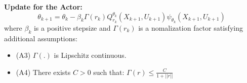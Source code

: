 \documentclass{article}
\begin{document}
\begin{flushleft}
\textbf{Update for the Actor: }
$$\theta_{k+1}=\theta_k-\beta_k\Gamma(r_k){Q_{r_k}^{\theta_k}(X_{k+1},U_{k+1})\psi_{\theta_k}(X_{k+1},U_{k+1})}$$
where $\beta_k$ is a positive stepsize and $\Gamma(r_k)$ is a nomalization factor satisfying additional assumptions:

\begin{itemize}
 \begin{itemize}
\item (A3) $\Gamma(.)$ is Lipschitz continuous. 
\item (A4) There exists $C > 0$ such that: $\Gamma(r) \leq \frac{C}{1+||r||}$
 \end{itemize}
 \end{itemize}

\end{flushleft}
\end{document}
